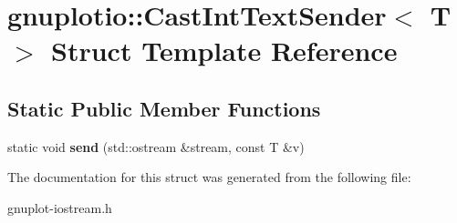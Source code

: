 \hypertarget{structgnuplotio_1_1CastIntTextSender}{}\section{gnuplotio\+:\+:Cast\+Int\+Text\+Sender$<$ T $>$ Struct Template Reference}
\label{structgnuplotio_1_1CastIntTextSender}
\subsection*{Static Public Member Functions}
\begin{DoxyCompactItemize}
\item 
\mbox{\label{structgnuplotio_1_1CastIntTextSender_a42733f83f843a375437e7e5f716ea65e}} 
static void {\bfseries send} (std\+::ostream \&stream, const T \&v)
\end{DoxyCompactItemize}


The documentation for this struct was generated from the following file\+:\begin{DoxyCompactItemize}
\item 
gnuplot-\/iostream.\+h\end{DoxyCompactItemize}
